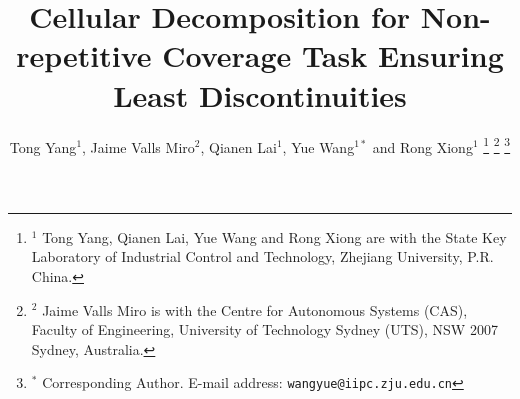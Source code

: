\documentclass[journal]{IEEEtran}
\begin{document}
%
\title{Cellular Decomposition for Non-repetitive Coverage Task Ensuring Least Discontinuities}
%
%
%


\author{Tong Yang$^1$, Jaime Valls Miro$^2$, Qianen Lai$^1$, Yue Wang$^{1*}$ and Rong Xiong$^1$
\thanks{$^1$ Tong Yang, Qianen Lai, Yue Wang and Rong Xiong are with the State Key Laboratory of Industrial Control and Technology, Zhejiang University, P.R. China. 
}
\thanks{$^2$ Jaime Valls Miro is with the Centre for Autonomous Systems (CAS), Faculty of Engineering, University of Technology Sydney (UTS), NSW 2007 Sydney, Australia.}
\thanks{$^*$ Corresponding Author. \newline \indent
E-mail address: {\tt\small wangyue@iipc.zju.edu.cn}}
}

% 
%
\end{document}
